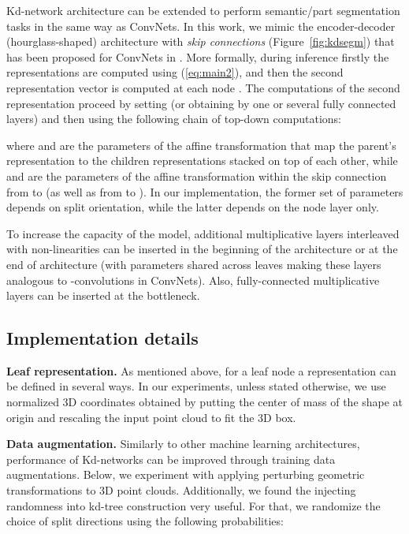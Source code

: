 \documentclass[10pt,twocolumn,letterpaper]{article}
\newcommand{\fig}[1]{Figure~\ref{fig:#1}}
\newcommand{\eq}[1]{(\ref{eq:#1})}
\begin{document}
Kd-network architecture can be extended to perform semantic/part segmentation tasks in the same way as ConvNets. In this work, we mimic the encoder-decoder (hourglass-shaped) architecture with \textit{skip connections} (\fig{kdsegm}) that has been proposed for ConvNets in \cite{Long15,Ronneberger15}. More formally, during inference firstly the representations  are computed using \eq{main2}, and then the second representation vector  is computed at each node . The computations of the second representation proceed by setting  (or obtaining  by one or several fully connected layers) and then using the following chain of top-down computations:

where  and  are the parameters of the affine transformation that map the parent's representation to the children representations stacked on top of each other, while  and  are the parameters of the affine transformation within the skip connection from  to  (as well as from  to ). In our implementation, the former set of parameters depends on split orientation, while the latter depends on the node layer only.

To increase the capacity of the model, additional multiplicative layers interleaved with non-linearities can be inserted in the beginning of the architecture or at the end of architecture (with parameters shared across leaves making these layers analogous to -convolutions in ConvNets). Also, fully-connected multiplicative layers can be inserted at the bottleneck. 

\subsection{Implementation details}

\textbf{Leaf representation.} As mentioned above, for a leaf node  a representation  can be defined in several ways. In our experiments, unless stated otherwise, we use normalized 3D coordinates obtained by putting the center of mass of the shape at origin and rescaling the input point cloud to fit the  3D box. 

\textbf{Data augmentation.} Similarly to other machine learning architectures, performance of Kd-networks can be improved through training data augmentations. Below, we experiment with applying perturbing geometric transformations to 3D point clouds. Additionally, we found the injecting randomness into kd-tree construction very useful. For that, we randomize the choice of split directions using the following probabilities:
\end{document}
